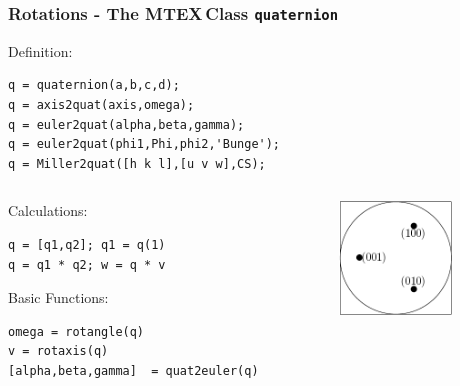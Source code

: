 \documentclass{beamer}
\newcommand{\MTEX}{{\bf {\color{red}M}TEX\,}}%
\begin{document}
\begin{frame}[fragile]
  \frametitle{Rotations - The \MTEX Class \texttt{\bf quaternion}}

Definition:

\begin{lstlisting}
q = quaternion(a,b,c,d); 
q = axis2quat(axis,omega);  
q = euler2quat(alpha,beta,gamma); 
q = euler2quat(phi1,Phi,phi2,'Bunge'); 
q = Miller2quat([h k l],[u v w],CS); 
\end{lstlisting}

\medskip

\begin{columns}
  \begin{column}{8.5cm}

    Calculations:
    
\begin{lstlisting}
q = [q1,q2]; q1 = q(1)
q = q1 * q2; w = q * v   
\end{lstlisting}
    
    \medskip
    
    Basic Functions:
    
\begin{lstlisting}
omega = rotangle(q)
v = rotaxis(q)
[alpha,beta,gamma]  = quat2euler(q)
\end{lstlisting}
    
  \end{column}
  
  \begin{column}{3cm}
    \includegraphics[width=3cm]{pic/quaternion}
  \end{column}

\end{columns}
\end{frame}
\end{document}
